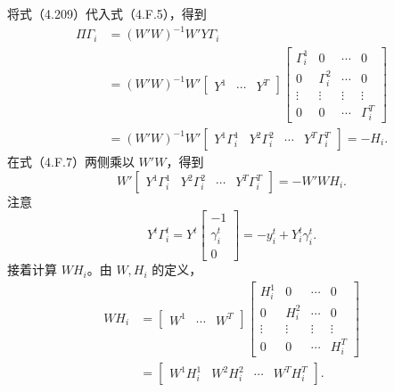 将式（4.209）代入式（4.F.5），得到
\begin{equation}
\begin{aligned}
\Pi\Gamma_i
&=(W'W)^{-1}W'Y\Gamma_i\\
&=(W'W)^{-1}W'\begin{bmatrix}Y^1&\cdots&Y^T\end{bmatrix}
\begin{bmatrix}
\Gamma_i^1&0&\cdots&0\\0&\Gamma_i^2&\cdots&0\\
\vdots&\vdots&\vdots&\vdots\\0&0&\cdots&\Gamma_i^T
\end{bmatrix}\\
&=(W'W)^{-1}W'\begin{bmatrix}Y^1\Gamma_i^1&Y^2\Gamma_i^2&\cdots&Y^T\Gamma_i^T\end{bmatrix}
=-H_i.
\end{aligned}\tag{4.F.6}
\end{equation}
在式（4.F.7）两侧乘以 $W'W$，得到
\begin{equation}
W'\begin{bmatrix}Y^1\Gamma_i^1&Y^2\Gamma_i^2&\cdots&Y^T\Gamma_i^T\end{bmatrix}
=-W'WH_i.\tag{4.F.7}
\end{equation}
注意
\begin{equation}
Y^t\Gamma_i^t=Y^t\begin{bmatrix}-1\\\gamma_i^t\\0\end{bmatrix}
=-y_i^t+Y_i^t\gamma_i^t.\tag{4.F.8}
\end{equation}
接着计算 $WH_i$。由 $W,H_i$ 的定义，
\begin{equation}
\begin{aligned}
WH_i
&=\begin{bmatrix}W^1&\cdots&W^T\end{bmatrix}
\begin{bmatrix}
H_i^1&0&\cdots&0\\0&H_i^2&\cdots&0\\
\vdots&\vdots&\vdots&\vdots\\0&0&\cdots&H_i^T
\end{bmatrix}\\
&=\begin{bmatrix}W^1H_i^1&W^2H_i^2&\cdots&W^TH_i^T\end{bmatrix}.
\end{aligned}\tag{4.F.9}
\end{equation}
